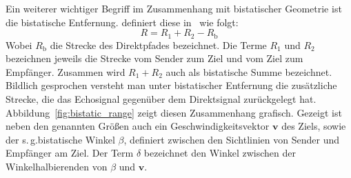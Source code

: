 Ein weiterer wichtiger Begriff im Zusammenhang mit bistatischer Geometrie ist die bistatische Entfernung. \citeauthor{Malanowski2019} definiert diese in~\cite[S.~10]{Malanowski2019} wie folgt:%
%
\begin{equation}
    R = R_1 + R_2 - R_\text{b}
\end{equation}\label{eq:bistatic_range}%
%
Wobei \(R_\text{b}\) die Strecke des Direktpfades bezeichnet. Die Terme \(R_1\) und \(R_2\) bezeichnen jeweils die Strecke vom Sender zum Ziel und vom Ziel zum Empfänger. Zusammen wird \(R_1 + R_2\) auch als bistatische Summe bezeichnet. Bildlich gesprochen versteht man unter bistatischer Entfernung die zusätzliche Strecke, die das Echosignal gegenüber dem Direktsignal zurückgelegt hat. Abbildung~\ref{fig:bistatic_range} zeigt diesen Zusammenhang grafisch. Gezeigt ist neben den genannten Größen auch ein Geschwindigkeitsvektor \(\boldsymbol{v}\) des Ziels, sowie der s.\,g.\@ bistatische Winkel \(\beta \), definiert zwischen den Sichtlinien von Sender und Empfänger am Ziel. Der Term \(\delta \) bezeichnet den Winkel zwischen der Winkelhalbierenden von \(\beta \) und \(\boldsymbol{v}\).

